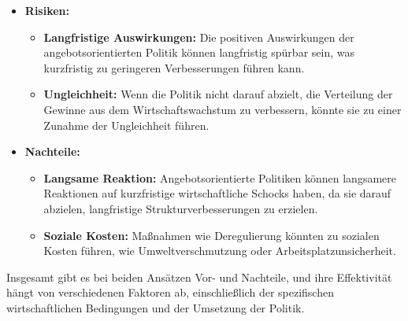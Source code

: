 \documentclass[12pt,a4paper]{report}
\begin{document}
\begin{itemize}
    \item \textbf{Risiken:}
    \begin{itemize}
        \item \textbf{Langfristige Auswirkungen:} Die positiven Auswirkungen der angebotsorientierten Politik können langfristig spürbar sein, was kurzfristig zu geringeren Verbesserungen führen kann.
        \item \textbf{Ungleichheit:} Wenn die Politik nicht darauf abzielt, die Verteilung der Gewinne aus dem Wirtschaftswachstum zu verbessern, könnte sie zu einer Zunahme der Ungleichheit führen.
    \end{itemize}
    
    \item \textbf{Nachteile:}
    \begin{itemize}
        \item \textbf{Langsame Reaktion:} Angebotsorientierte Politiken können langsamere Reaktionen auf kurzfristige wirtschaftliche Schocks haben, da sie darauf abzielen, langfristige Strukturverbesserungen zu erzielen.
        \item \textbf{Soziale Kosten:} Maßnahmen wie Deregulierung könnten zu sozialen Kosten führen, wie Umweltverschmutzung oder Arbeitsplatzunsicherheit.
    \end{itemize}
\end{itemize}

Insgesamt gibt es bei beiden Ansätzen Vor- und Nachteile, und ihre Effektivität hängt von verschiedenen Faktoren ab, einschließlich der spezifischen wirtschaftlichen Bedingungen und der Umsetzung der Politik.
\end{document}
